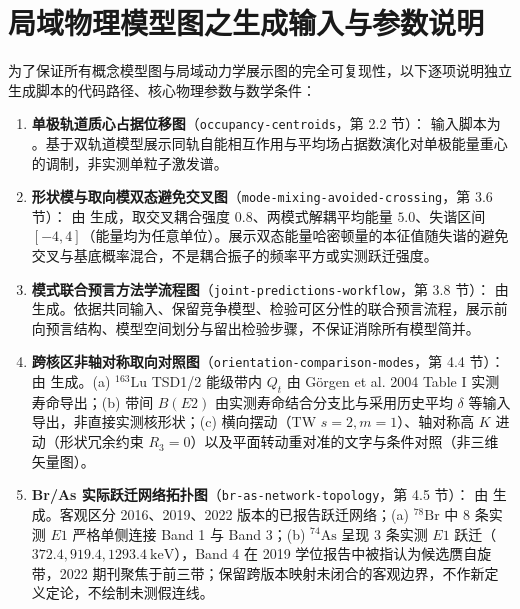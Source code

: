 \section{局域物理模型图之生成输入与参数说明}\label{sec:appF-additional-models}

为了保证所有概念模型图与局域动力学展示图的完全可复现性，以下逐项说明独立生成脚本的代码路径、核心物理参数与数学条件：
\begin{enumerate}[label=(\arabic*),leftmargin=2em]
    \item \textbf{单极轨道质心占据位移图}（\texttt{occupancy-centroids}，第 2.2 节）：
    输入脚本为 。基于双轨道模型展示同轨自能相互作用与平均场占据数演化对单极能量重心的调制，非实测单粒子激发谱。
    \vspace{1ex}
    \item \textbf{形状模与取向模双态避免交叉图}（\texttt{mode-mixing-avoided-crossing}，第 3.6 节）：
    由  生成，取交叉耦合强度 $0.8$、两模式解耦平均能量 $5.0$、失谐区间 $[-4, 4]$（能量均为任意单位）。展示双态能量哈密顿量的本征值随失谐的避免交叉与基底概率混合，不是耦合振子的频率平方或实测跃迁强度。
    \vspace{1ex}
    \item \textbf{模式联合预言方法学流程图}（\texttt{joint-predictions-workflow}，第 3.8 节）：
    由  生成。依据共同输入、保留竞争模型、检验可区分性的联合预言流程，展示前向预言结构、模型空间划分与留出检验步骤，不保证消除所有模型简并。
    \vspace{1ex}
    \item \textbf{跨核区非轴对称取向对照图}（\texttt{orientation-comparison-modes}，第 4.4 节）：
    由  生成。(a) $^{163}\mathrm{Lu}$ TSD1/2 能级带内 $Q_t$ 由 Görgen et al. 2004 Table I 实测寿命导出；(b) 带间 $B(E2)$ 由实测寿命结合分支比与采用历史平均 $\delta$ 等输入导出，非直接实测核形状；(c) 横向摆动（TW $s=2, m=1$）、轴对称高 $K$ 进动（形状冗余约束 $R_3=0$）以及平面转动重对准的文字与条件对照（非三维矢量图）。
    \vspace{1ex}
    \item \textbf{Br/As 实际跃迁网络拓扑图}（\texttt{br-as-network-topology}，第 4.5 节）：
    由  生成。客观区分 2016、2019、2022 版本的已报告跃迁网络；(a) $^{78}\mathrm{Br}$ 中 8 条实测 $E1$ 严格单侧连接 Band 1 与 Band 3；(b) $^{74}\mathrm{As}$ 呈现 3 条实测 $E1$ 跃迁（$372.4, 919.4, 1293.4\ \mathrm{keV}$），Band 4 在 2019 学位报告中被指认为候选赝自旋带，2022 期刊聚焦于前三带；保留跨版本映射未闭合的客观边界，不作新定义定论，不绘制未测假连线。

\end{enumerate}
